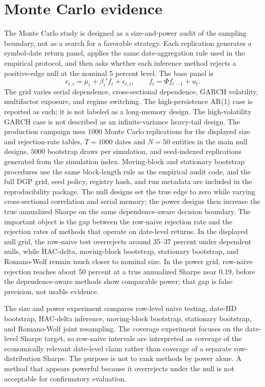 \documentclass[12pt,a4paper]{article}
\begin{document}
\section{Monte Carlo evidence}
\label{sec:simulation}

The Monte Carlo study is designed as a size-and-power audit of the
sampling boundary, not as a search for a favorable strategy.  Each
replication generates a symbol-date return panel, applies the same
date-aggregation rule used in the empirical protocol, and then asks
whether each inference method rejects a positive-edge null at the
nominal 5 percent level.  The base panel is
\[
  r_{t,i}=\mu_t+\beta_i'f_t+\epsilon_{t,i},
  \qquad
  f_t=\Phi f_{t-1}+u_t .
\]
The grid varies serial dependence, cross-sectional dependence, GARCH
volatility, multifactor exposure, and regime switching.  The
high-persistence AR(1) case is reported as such; it is not labeled as a
long-memory design.  The high-volatility GARCH case is not described as
an infinite-variance heavy-tail design.
The production campaign uses \(1000\) Monte Carlo replications for the
displayed size and rejection-rate tables, \(T=1000\) dates and \(N=50\)
entities in the main null designs, \(5000\) bootstrap draws per
simulation, and seed-indexed replications generated from the simulation
index.  Moving-block and stationary bootstrap procedures use the same
block-length rule as the empirical audit code, and the full DGP grid,
seed policy, registry hash, and run metadata are included in the
reproducibility package.
The null designs set the true edge to zero while varying
cross-sectional correlation and serial memory; the power designs then
increase the true annualized Sharpe on the same dependence-aware
decision boundary.  The important object is the gap between the
row-naive rejection rate and the rejection rates of methods that operate
on date-level returns.  In the displayed null grid, the row-naive test
overrejects around 35--37 percent under dependent nulls, while HAC-delta,
moving-block bootstrap, stationary bootstrap, and Romano-Wolf remain much
closer to nominal size.  In the power grid, row-naive rejection reaches
about 50 percent at a true annualized Sharpe near 0.19, before the
dependence-aware methods show comparable power; that gap is false
precision, not usable evidence.

The size and power experiment compares row-level naive testing,
date-IID bootstrap, HAC-delta inference, moving-block bootstrap,
stationary bootstrap, and Romano-Wolf joint resampling.  The coverage
experiment focuses on the date-level Sharpe target, so row-naive
intervals are interpreted as coverage of the economically relevant
date-level claim rather than coverage of a separate row-distribution
Sharpe.  The purpose is not to rank methods by power alone.  A method
that appears powerful because it overrejects under the null is not
acceptable for confirmatory evaluation.
\end{document}
